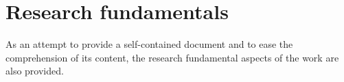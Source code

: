 \documentclass[ENG,PhD]{cinvestav}
\begin{document}
%                                                                                                                                                                                
\section{Research fundamentals}
\label{sec:research-fundamentals} 
As an attempt to provide a self-contained document and to ease the comprehension of its content, the research fundamental aspects of the work are also provided.
\end{document}
